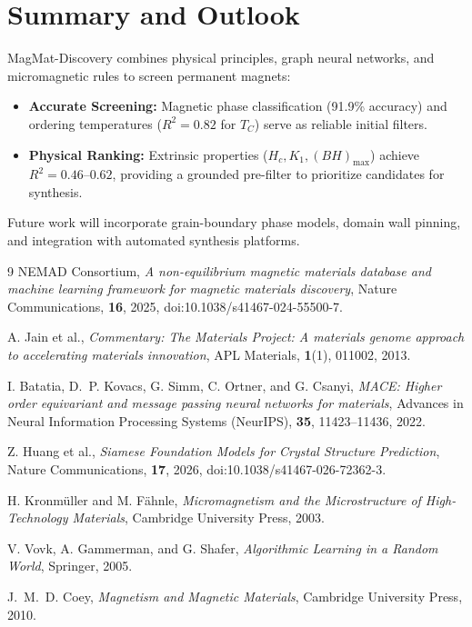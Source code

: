 \documentclass[11pt,a4paper]{article}
\begin{document}
\section{Summary and Outlook}

MagMat-Discovery combines physical principles, graph neural networks, and micromagnetic rules to screen permanent magnets:
\begin{itemize}[leftmargin=1.5em, itemsep=2pt]
    \item \textbf{Accurate Screening:} Magnetic phase classification (91.9\% accuracy) and ordering temperatures ($R^2 = 0.82$ for $T_C$) serve as reliable initial filters.
    \item \textbf{Physical Ranking:} Extrinsic properties ($H_c, K_1, (BH)_{\max}$) achieve $R^2 = 0.46$--$0.62$, providing a grounded pre-filter to prioritize candidates for synthesis.
\end{itemize}

Future work will incorporate grain-boundary phase models, domain wall pinning, and integration with automated synthesis platforms.

\vspace{0.4cm}
{\small
\begin{thebibliography}{9}
NEMAD Consortium, \emph{A non-equilibrium magnetic materials database and machine learning framework for magnetic materials discovery}, Nature Communications, \textbf{16}, 2025, doi:10.1038/s41467-024-55500-7.

A. Jain et al., \emph{Commentary: The Materials Project: A materials genome approach to accelerating materials innovation}, APL Materials, \textbf{1}(1), 011002, 2013.

I. Batatia, D.~P. Kovacs, G. Simm, C. Ortner, and G. Csanyi, \emph{MACE: Higher order equivariant and message passing neural networks for materials}, Advances in Neural Information Processing Systems (NeurIPS), \textbf{35}, 11423--11436, 2022.

Z. Huang et al., \emph{Siamese Foundation Models for Crystal Structure Prediction}, Nature Communications, \textbf{17}, 2026, doi:10.1038/s41467-026-72362-3.

H. Kronmüller and M. Fähnle, \emph{Micromagnetism and the Microstructure of High-Technology Materials}, Cambridge University Press, 2003.

V. Vovk, A. Gammerman, and G. Shafer, \emph{Algorithmic Learning in a Random World}, Springer, 2005.

J.~M.~D. Coey, \emph{Magnetism and Magnetic Materials}, Cambridge University Press, 2010.
\end{thebibliography}
}
\end{document}
